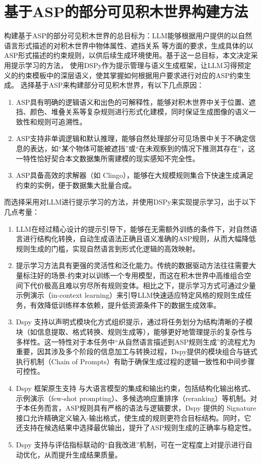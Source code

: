 \section{基于ASP的部分可见积木世界构建方法}
构建基于ASP的部分可见积木世界的总目标为：LLM能够根据用户提供的以自然语言形式描述的对积木世界中物体属性、遮挡关系
等方面的要求，生成具体的以ASP形式描述的约束规则，以供后续生成环境使用。基于这一总目标，本文决定采用提示学习的方法，
使用DSPy作为提示管理与语义生成框架，让LLM习得预定义的约束模板中的深层语义，使其掌握如何根据用户要求进行对应的ASP约束生成。
选择基于ASP来构建部分可见积木世界，有以下几点原因：
\begin{enumerate}[nosep]
\item ASP具有明确的逻辑语义和出色的可解释性，能够对积木世界中关于位置、遮挡、颜色、堆叠关系等复杂规则进行形式化建模，同时保证生成图像的语义一致性和规则可追溯性。
\item ASP支持非单调逻辑和默认推理，能够自然处理部分可见场景中关于不确定信息的表达，如“某个物体可能被遮挡”或“在未观察到的情况下推测其存在”，这一特性恰好契合本文数据集所需建模的现实感知不完全性。
\item ASP具备高效的求解器（如 Clingo），能够在大规模规则集合下快速生成满足约束的实例，便于数据集大批量合成。
\end{enumerate}
而选择采用对LLM进行提示学习的方法，并使用DSPy来实现提示学习，出于以下几点考量：
\begin{enumerate}[nosep]
\item LLM在经过精心设计的提示引导下，能够在无需额外训练的条件下，对自然语言进行结构化转换，自动生成语法正确且语义准确的ASP规则，从而大幅降低规则生成的门槛，实现自然语言到形式化逻辑的高效映射。
\item 提示学习方法具有更强的灵活性和泛化能力。传统的数据驱动方法往往需要大量标注好的场景-约束对以训练一个专用模型，而这在积木世界中高维组合空间下代价极高且难以穷尽所有规则变体。相比之下，提示学习方式可通过少量示例演示（in-context learning）来引导LLM快速适应特定风格的规则生成任务，有效降低训练样本依赖，提升低资源条件下的数据生成效率。
\item Dspy 支持以声明式模块化方式组织提示，通过将任务划分为结构清晰的子模块（如信息提取、格式转换、规则生成等），能够更好地管理提示的复杂性与多样性。这一特性对于本任务中“从自然语言描述到ASP规则生成”的流程尤为重要，因其涉及多个阶段的信息加工与转换过程，Dspy提供的模块组合与链式执行机制（Chain of Prompts）有助于确保生成过程的逻辑一致性和中间步骤可控性。
\item Dspy 框架原生支持 与大语言模型的集成和输出约束，包括结构化输出格式、示例演示（few-shot prompting）、多候选响应重排序（reranking）等机制。对于本任务而言，ASP规则具有严格的语法与逻辑要求，Dspy 提供的 Signature 接口允许精确定义输入-输出格式，使生成的规则更符合目标结构。同时，它还支持在候选结果中选择最优输出，提升了ASP规则生成的正确率与稳定性。
\item Dspy 支持与评估指标联动的“自我改进”机制，可在一定程度上对提示进行自动优化，从而提升生成结果质量。
\end{enumerate}

